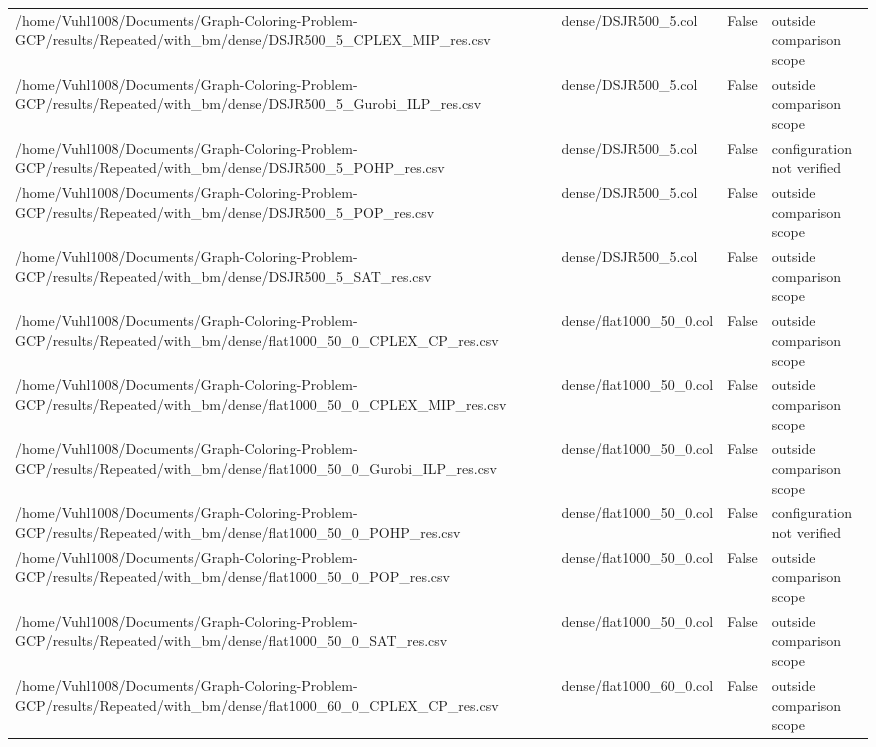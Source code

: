 \begin{table}[htbp]
\begin{tabular}{llll}
/home/Vuhl1008/Documents/Graph-Coloring-Problem-GCP/results/Repeated/with\_bm/dense/DSJR500\_5\_CPLEX\_MIP\_res.csv & dense/DSJR500\_5.col & False & outside comparison scope \\
/home/Vuhl1008/Documents/Graph-Coloring-Problem-GCP/results/Repeated/with\_bm/dense/DSJR500\_5\_Gurobi\_ILP\_res.csv & dense/DSJR500\_5.col & False & outside comparison scope \\
/home/Vuhl1008/Documents/Graph-Coloring-Problem-GCP/results/Repeated/with\_bm/dense/DSJR500\_5\_POHP\_res.csv & dense/DSJR500\_5.col & False & configuration not verified \\
/home/Vuhl1008/Documents/Graph-Coloring-Problem-GCP/results/Repeated/with\_bm/dense/DSJR500\_5\_POP\_res.csv & dense/DSJR500\_5.col & False & outside comparison scope \\
/home/Vuhl1008/Documents/Graph-Coloring-Problem-GCP/results/Repeated/with\_bm/dense/DSJR500\_5\_SAT\_res.csv & dense/DSJR500\_5.col & False & outside comparison scope \\
/home/Vuhl1008/Documents/Graph-Coloring-Problem-GCP/results/Repeated/with\_bm/dense/flat1000\_50\_0\_CPLEX\_CP\_res.csv & dense/flat1000\_50\_0.col & False & outside comparison scope \\
/home/Vuhl1008/Documents/Graph-Coloring-Problem-GCP/results/Repeated/with\_bm/dense/flat1000\_50\_0\_CPLEX\_MIP\_res.csv & dense/flat1000\_50\_0.col & False & outside comparison scope \\
/home/Vuhl1008/Documents/Graph-Coloring-Problem-GCP/results/Repeated/with\_bm/dense/flat1000\_50\_0\_Gurobi\_ILP\_res.csv & dense/flat1000\_50\_0.col & False & outside comparison scope \\
/home/Vuhl1008/Documents/Graph-Coloring-Problem-GCP/results/Repeated/with\_bm/dense/flat1000\_50\_0\_POHP\_res.csv & dense/flat1000\_50\_0.col & False & configuration not verified \\
/home/Vuhl1008/Documents/Graph-Coloring-Problem-GCP/results/Repeated/with\_bm/dense/flat1000\_50\_0\_POP\_res.csv & dense/flat1000\_50\_0.col & False & outside comparison scope \\
/home/Vuhl1008/Documents/Graph-Coloring-Problem-GCP/results/Repeated/with\_bm/dense/flat1000\_50\_0\_SAT\_res.csv & dense/flat1000\_50\_0.col & False & outside comparison scope \\
/home/Vuhl1008/Documents/Graph-Coloring-Problem-GCP/results/Repeated/with\_bm/dense/flat1000\_60\_0\_CPLEX\_CP\_res.csv & dense/flat1000\_60\_0.col & False & outside comparison scope \\

\end{tabular}
\end{table}
